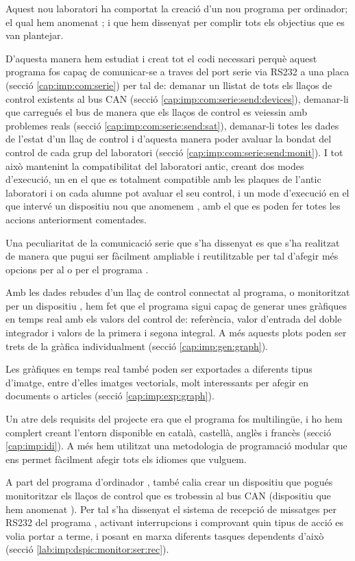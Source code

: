 Aquest nou laboratori ha comportat la creació d'un nou programa per ordinador; el qual hem anomenat \DCSMonitor; i que hem dissenyat per complir tots els objectius que es van plantejar. 

D'aquesta manera hem estudiat i creat tot el codi necessari perquè aquest programa fos capaç de comunicar-se a traves del port serie via RS232 a una placa \FLEX (secció \ref{cap:imp:com:serie}) per tal de: demanar un llistat de tots els llaços de control existents al bus CAN (secció \ref{cap:imp:com:serie:send:devices}), demanar-li que carregués el bus de manera que els llaços de control es veiessin amb problemes reals (secció \ref{cap:imp:com:serie:send:sat}), demanar-li totes les dades de l'estat d'un llaç de control i d'aquesta manera poder avaluar la bondat del control de cada grup del laboratori (secció \ref{cap:imp:com:serie:send:monit}). I tot això mantenint la compatibilitat del laboratori antic, creant dos modes d'execució, un en el que es totalment compatible amb les plaques \FLEX de l'antic laboratori i on cada alumne pot avaluar el seu control, i un mode d'execució en el que intervé un dispositiu nou que anomenem \Monitor, amb el que es poden fer totes les accions anteriorment comentades.

Una peculiaritat de la comunicació serie que s'ha dissenyat es que s'ha realitzat de manera que pugui ser fàcilment ampliable i reutilitzable per tal d'afegir més opcions per al \Monitor o per el programa \DCSMonitor.

Amb les dades rebudes d'un llaç de control connectat al programa, o monitoritzat per un dispositiu \Monitor, hem fet que el programa \DCSMonitor sigui capaç de generar unes gràfiques en temps real amb els valors del control de: referència, valor d'entrada del doble integrador i valors de la primera i segona integral. A més aquests plots poden ser trets de la gràfica individualment (secció \ref{cap:imp:gen:graph}).

Les gràfiques en temps real també poden ser exportades a diferents tipus d'imatge, entre d'elles imatges vectorials, molt interessants per afegir en documents o articles (secció \ref{cap:imp:exp:graph}).

Un atre dels requisits del projecte era que el programa fos multilingüe, i ho hem complert creant l'entorn disponible en català, castellà, anglès i francès (secció \ref{cap:imp:idi}). A més hem utilitzat una metodologia de programació modular que ens permet fàcilment afegir tots els idiomes que vulguem. 

A part del programa d'ordinador \DCSMonitor, també calia crear un dispositiu que pogués monitoritzar els llaços de control que es trobessin al bus CAN (dispositiu que hem anomenat \Monitor). Per tal s'ha dissenyat el sistema de recepció de missatges per RS232 del programa \DCSMonitor, activant interrupcions i comprovant quin tipus de acció es volia portar a terme, i posant en marxa diferents tasques dependents d'això (secció \ref{lab:imp:dspic:monitor:ser:rec}).

